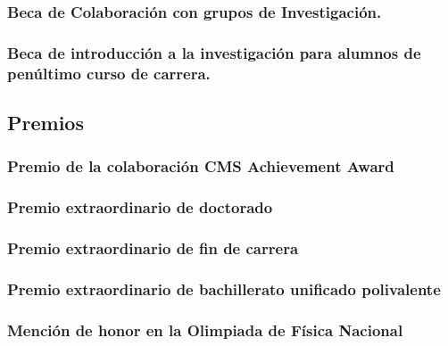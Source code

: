 \documentclass[a4paper, 11pt, twoside, openright]{report}
\begin{document}
\subsubsection{Beca de Colaboración con grupos de Investigación.}


\subsubsection{Beca de introducción a la investigación para alumnos de penúltimo curso de carrera.}



\subsection{Premios}


\subsubsection{Premio de la colaboración CMS Achievement Award}


\subsubsection{Premio extraordinario de doctorado}


\subsubsection{Premio extraordinario de fin de carrera}


\subsubsection{Premio extraordinario de bachillerato unificado polivalente}


\subsubsection{Mención de honor en la Olimpiada de Física Nacional}

\end{document}
